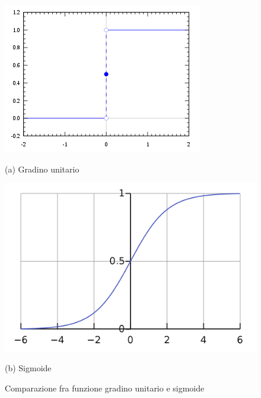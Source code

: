 \documentclass[12pt,a4paper,openright,twoside]{report}
\begin{document}
\begin{figure}[h]
\begin{minipage}[t]{0.49\linewidth}
\centering
\includegraphics[width=\linewidth]{gradino.png}

(a) Gradino unitario
\end{minipage}%
\hfill\vrule\hfill
\begin{minipage}[t]{0.49\linewidth}
\centering
\includegraphics[width=\linewidth]{sigmoid.png}

(b)  Sigmoide
\end{minipage}
\caption{Comparazione fra funzione gradino unitario e sigmoide }
\end{figure}
\end{document}
